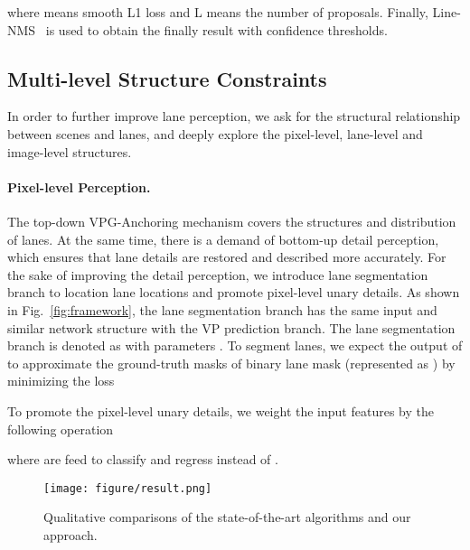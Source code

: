 \documentclass{article}
\begin{document}
where  means smooth L1 loss and L means the number of proposals. Finally, Line-NMS~\cite{li2019line} is used to obtain the finally result with confidence thresholds.

\subsection{Multi-level Structure Constraints}
In order to further improve lane perception, we ask for the structural relationship between scenes and lanes, and deeply explore the pixel-level, lane-level and image-level structures.

\paragraph{Pixel-level Perception.}
The top-down VPG-Anchoring mechanism covers the structures and distribution of lanes. At the same time, there is a demand of bottom-up detail perception, which ensures that lane details are restored and described more accurately. For the sake of improving the detail perception, we introduce lane segmentation branch to location lane locations and promote pixel-level unary details. As shown in Fig.~\ref{fig:framework}, the lane segmentation branch has the same input and similar network structure with the VP prediction branch. The lane segmentation branch is denoted as  with parameters . To segment lanes, we expect the output of  to approximate the ground-truth masks of binary lane mask (represented as ) by minimizing the loss

To promote the pixel-level unary details, we weight the input features  by the following operation

where  are feed to classify and regress instead of .

\begin{figure*}[t]
\centering
\texttt{[image: figure/result.png]}
\caption{Qualitative comparisons of the state-of-the-art algorithms and our approach.}
\label{fig:result}
\end{figure*}
\end{document}
